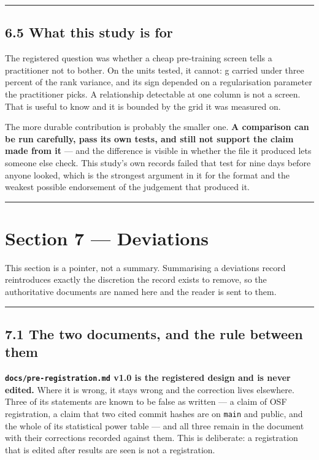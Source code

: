 \documentclass[
  10pt,
]{article}
\begin{document}
\begin{center}\rule{0.5\linewidth}{0.5pt}\end{center}

\subsection{6.5 What this study is for}\label{what-this-study-is-for}

The registered question was whether a cheap pre-training screen tells a
practitioner not to bother. On the units tested, it cannot: g carried
under three percent of the rank variance, and its sign depended on a
regularisation parameter the practitioner picks. A relationship
detectable at one column is not a screen. That is useful to know and it
is bounded by the grid it was measured on.

The more durable contribution is probably the smaller one. \textbf{A
comparison can be run carefully, pass its own tests, and still not
support the claim made from it} --- and the difference is visible in
whether the file it produced lets someone else check. This study's own
records failed that test for nine days before anyone looked, which is
the strongest argument in it for the format and the weakest possible
endorsement of the judgement that produced it.

\begin{center}\rule{0.5\linewidth}{0.5pt}\end{center}

\section{Section 7 --- Deviations}\label{section-7-deviations}

This section is a pointer, not a summary. Summarising a deviations
record reintroduces exactly the discretion the record exists to remove,
so the authoritative documents are named here and the reader is sent to
them.

\begin{center}\rule{0.5\linewidth}{0.5pt}\end{center}

\subsection{7.1 The two documents, and the rule between
them}\label{the-two-documents-and-the-rule-between-them}

\textbf{\texttt{docs/\allowbreak{}pre-registration.md} v1.0 is the registered design
and is never edited.} Where it is wrong, it stays wrong and the
correction lives elsewhere. Three of its statements are known to be
false as written --- a claim of OSF registration, a claim that two cited
commit hashes are on \texttt{main} and public, and the whole of its
statistical power table --- and all three remain in the document with
their corrections recorded against them. This is deliberate: a
registration that is edited after results are seen is not a
registration.
\end{document}
